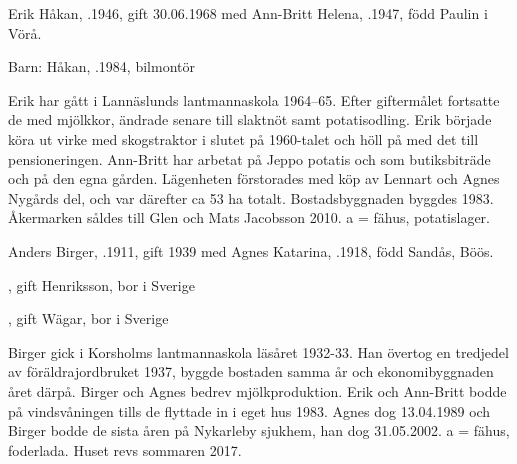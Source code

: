
%
Erik Håkan, .1946, gift 30.06.1968 med Ann-Britt Helena, .1947, född Paulin i Vörå.

Barn:  Håkan, .1984, bilmontör

Erik har gått i Lannäslunds lantmannaskola 1964--65. Efter giftermålet fortsatte de med mjölkkor, ändrade senare till slaktnöt samt potatisodling. Erik började köra ut virke med skogstraktor i slutet på 1960-talet och höll på med det till pensioneringen. Ann-Britt har arbetat på Jeppo potatis och som butiksbiträde och på den egna gården. Lägenheten förstorades med köp av Lennart och Agnes Nygårds del, och var därefter ca 53 ha totalt. Bostadsbyggnaden byggdes 1983. Åkermarken såldes till Glen och Mats Jacobsson 2010. a = fähus, potatislager.



%



%
Anders Birger, .1911, gift 1939 med Agnes Katarina, .1918, född Sandås, Böös.
\begin{jhchildren}
  \item {}, gift Henriksson, bor i Sverige
  \item {}, gift Wägar, bor i Sverige
  \item {}
\end{jhchildren}

Birger gick i Korsholms lantmannaskola läsåret 1932-33. Han övertog en tredjedel av föräldrajordbruket 1937, byggde bostaden samma år och ekonomibyggnaden året därpå. Birger och Agnes bedrev mjölkproduktion. Erik och Ann-Britt bodde på vindsvåningen tills de flyttade in i eget hus 1983. Agnes dog 13.04.1989 och Birger bodde de sista åren på Nykarleby sjukhem, han dog 31.05.2002. a = fähus, foderlada. Huset revs sommaren 2017.




